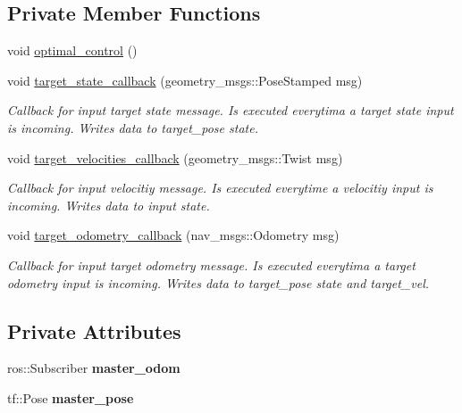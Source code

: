 \subsection*{Private Member Functions}
\begin{DoxyCompactItemize}
\item 
void \hyperlink{classSlave_a2a38a730d6ac93fcced035a7d764612d}{optimal\+\_\+control} ()
\item 
void \hyperlink{classSlave_a09394d0f823a06e04f6259ee490bc867}{target\+\_\+state\+\_\+callback} (geometry\+\_\+msgs\+::\+Pose\+Stamped msg)\hypertarget{classSlave_a09394d0f823a06e04f6259ee490bc867}{}\label{classSlave_a09394d0f823a06e04f6259ee490bc867}

\begin{DoxyCompactList}\small\item\em Callback for input target state message. Is executed everytima a target state input is incoming. Writes data to target\+\_\+pose state. \end{DoxyCompactList}\item 
void \hyperlink{classSlave_a2227f30ab058b623de7f6a940d079c90}{target\+\_\+velocities\+\_\+callback} (geometry\+\_\+msgs\+::\+Twist msg)\hypertarget{classSlave_a2227f30ab058b623de7f6a940d079c90}{}\label{classSlave_a2227f30ab058b623de7f6a940d079c90}

\begin{DoxyCompactList}\small\item\em Callback for input velocitiy message. Is executed everytime a velocitiy input is incoming. Writes data to input state. \end{DoxyCompactList}\item 
void \hyperlink{classSlave_a0d732637d1c0d06c214112a381ead6be}{target\+\_\+odometry\+\_\+callback} (nav\+\_\+msgs\+::\+Odometry msg)\hypertarget{classSlave_a0d732637d1c0d06c214112a381ead6be}{}\label{classSlave_a0d732637d1c0d06c214112a381ead6be}

\begin{DoxyCompactList}\small\item\em Callback for input target odometry message. Is executed everytima a target odometry input is incoming. Writes data to target\+\_\+pose state and target\+\_\+vel. \end{DoxyCompactList}\end{DoxyCompactItemize}
\subsection*{Private Attributes}
\begin{DoxyCompactItemize}
\item 
ros\+::\+Subscriber {\bfseries master\+\_\+odom}\hypertarget{classSlave_ae16b74032864ebb31211f992d37a73ab}{}\label{classSlave_ae16b74032864ebb31211f992d37a73ab}

\item 
tf\+::\+Pose {\bfseries master\+\_\+pose}\hypertarget{classSlave_ab6effa214fce2263784c296ecba8d3e0}{}\label{classSlave_ab6effa214fce2263784c296ecba8d3e0}

\end{DoxyCompactItemize}
